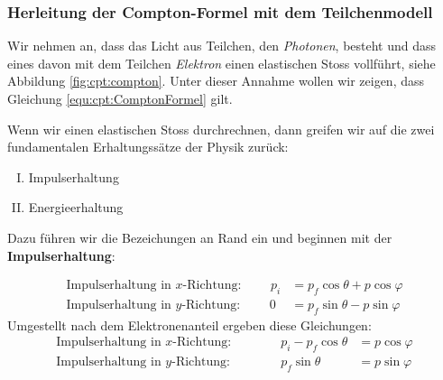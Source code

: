 \documentclass[a4paper, 10pt]{scrbook}
\begin{document}
\subsubsection{Herleitung der Compton-Formel mit dem Teilchenmodell}
\label{sec:cpt:herleitung}
\begin{minipage}{.7\linewidth}
Wir nehmen an, dass das Licht aus Teilchen, den \emph{Photonen}, besteht und dass eines davon mit dem Teilchen \emph{Elektron} einen elastischen Stoss vollführt, siehe Abbildung \ref{fig:cpt:compton}.
Unter dieser Annahme wollen wir zeigen, dass Gleichung \eqref{equ:cpt:ComptonFormel} gilt.

Wenn wir einen elastischen Stoss \glqq durchrechnen\grqq, dann greifen wir auf die zwei fundamentalen Erhaltungssätze der Physik zurück:
\begin{enumerate}[I)]\setlength\itemsep{0pt}
 \item Impulserhaltung
 \item Energieerhaltung
\end{enumerate}
Dazu führen wir die Bezeichungen an Rand ein und beginnen mit der {\bfseries Impulserhaltung}:
\end{minipage}
\hfill
\begin{minipage}{.19\linewidth}
\end{minipage}
\begin{align*}
 \text{Impulserhaltung in $x$-Richtung: }\qquad p_i &= p_f \cos\theta + p\cos\varphi\\
 \text{Impulserhaltung in $y$-Richtung: }\qquad 0 &= p_f \sin\theta - p\sin\varphi
\end{align*}
Umgestellt nach dem Elektronenanteil ergeben diese Gleichungen:
\begin{align}
 \text{Impulserhaltung in $x$-Richtung: }&&\qquad p_i - p_f \cos\theta &= p\cos\varphi\label{equ:cpt:ImpulsX}\\
 \text{Impulserhaltung in $y$-Richtung: }&&\qquad p_f \sin\theta &= p\sin\varphi\label{equ:cpt:ImpulsY}
\end{align}
\end{document}
